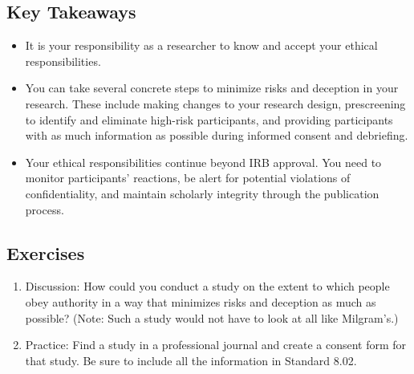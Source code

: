 \subsection{Key Takeaways}

\begin{fullwidth}

\begin{itemize}

\item It is your responsibility as a researcher to know and accept your ethical responsibilities.

\item You can take several concrete steps to minimize risks and deception in your research. These
include making changes to your research design, prescreening to identify and eliminate high-risk participants, and providing participants with as much information as possible during informed consent and debriefing.

\item Your ethical responsibilities continue beyond IRB approval. You need to monitor participants' reactions, be alert for potential violations of confidentiality, and maintain scholarly integrity through the publication process.


\end{itemize}

\end{fullwidth}


\subsection{Exercises}

\begin{fullwidth}

\begin{enumerate}

\item Discussion: How could you conduct a study on the extent to which people obey authority in a way that minimizes risks and deception as much as possible? (Note: Such a study would not have to look at all like Milgram's.)

\item Practice: Find a study in a professional journal and create a consent form for that study. Be sure to include all the information in Standard 8.02.

\end{enumerate}

\end{fullwidth}
